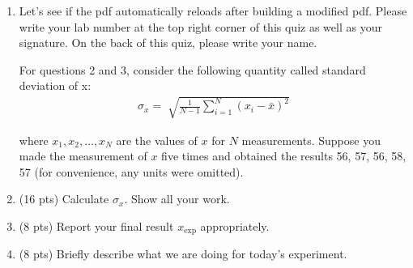 \documentclass[letterpaper, 11pt]{article}
\numberwithin{equation}{section}
\begin{document}
\begin{enumerate}
	\item Let's see if the pdf  automatically reloads after building a modified pdf. Please write your lab number at the top right corner of this quiz as well as your signature. On the back of this quiz, please write your name.\vspace{0.25cm}

For questions 2 and 3, consider the following quantity called standard deviation of x:
	\begin{align}
			\sigma_{x} = \sqrt[]{\frac{1}{N - 1} \sum_{i = 1}^{N} (x_{i} - \bar{x})^{2}}
	\end{align}
	
where \(x_{1}, x_{2}, \dots, x_{N}\) are the values of \(x\) for \(N\) measurements. Suppose you made the measurement of \(x\) five times and obtained the results 56, 57, 56, 58, 57 (for convenience, any units were omitted).

	\item (16 pts) Calculate \(\sigma_{x}\). Show all your work. 
	
	\item (8 pts) Report your final result \(x_{\text{exp}}\) appropriately. 
	
	\item (8 pts) Briefly describe what we are doing for today's experiment.   
\end{enumerate}
\printindex
\end{document}
